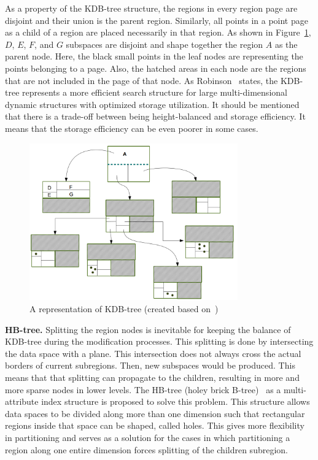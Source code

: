 \documentclass[a4paper,12pt]{article}
\begin{document}
As a property of the KDB-tree structure, the regions in every region page are disjoint and their union is the parent region. %
Similarly, all points in a point page as a child of a region are placed necessarily in that region.
As shown in Figure~\ref{figkdbtree}, $D$, $E$, $F$, and $G$ subspaces are disjoint and shape together the region $A$ as the parent node. Here, the black small points in the leaf nodes are representing the points belonging to a page. Also, the hatched areas in each node are the regions that are not included in the page of that node. 
As Robinson~\cite{kdbtree} states, the KDB-tree represents a more efficient search structure for large multi-dimensional dynamic structures with optimized storage utilization. It should be mentioned that there is a trade-off between being height-balanced and storage efficiency. It means that the storage efficiency can be even poorer in some cases.

\begin{figure}
\centering
\includegraphics[width=0.8\textwidth]{kdbtree}
\caption{A representation of KDB-tree (created based on~\cite{kdbtree})}
\label{figkdbtree}
\end{figure}

\textbf{HB-tree.} 
Splitting the region nodes is inevitable for keeping the balance of KDB-tree during the modification processes. This splitting is done by intersecting the data space with a plane. This intersection does not always cross the actual borders of current subregions. Then, new subspaces would be produced. This means that that splitting can propagate to the children, resulting in more and more sparse nodes in lower levels. The HB-tree (holey brick B-tree)~\cite{hbtree1} as a multi-attribute index structure is proposed to solve this problem. This structure allows data spaces to be divided along more than one dimension such that rectangular regions inside that space can be shaped, called holes.
This gives more flexibility in partitioning and serves as a solution for the cases in which partitioning a region along one entire dimension forces splitting of the children subregion. 
\end{document}

